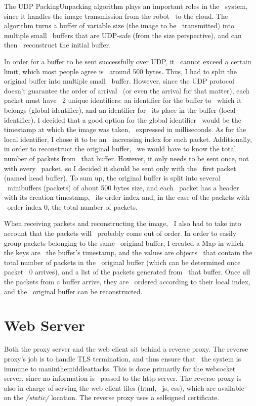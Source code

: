 The UDP Packing\-Unpacking algorithm plays an important roles in the \
system, since it handles the image transmission from the robot \
to the cloud.
The algorithm turns a buffer of variable size (the image to be \
transmitted) into multiple small \
buffers that are UDP-safe (from the size perspective), and can then \
reconstruct the initial buffer.

In order for a buffer to be sent successfully over UDP, it \
cannot exceed a certain limit, which most people agree is \
around 500 bytes.
Thus, I had to split the original buffer into multiple small \
buffer.
However, since the UDP protocol doesn't guarantee the order of arrival \
(or even the arrival for that matter), each packet must have \
2 unique identifiers: an identifier for the buffer to \
which it belongs (global identifier), and an identifier for \
its place in the buffer (local identifier).
I decided that a good option for the global identifier \
would be the timestamp at which the image was taken, \
expressed in milliseconds.
As for the local identifier, I chose it to be an \
increasing index for each packet.
Additionally, in order to reconstruct the original buffer, \
we would have to know the total number of packets from \
that buffer.
However, it only needs to be sent once, not with every \
packet, so I decided it should be sent only with the \
first packet (named head buffer).
To sum up, the original buffer is split into several \
mini\-buffers (packets) of about 500 bytes size, and each \
packet has a header with its creation timestamp, \
its order index and, in the case of the packets with \
order index 0, the total number of packets.

When receiving packets and reconstructing the image, \
I also had to take into account that the packets will \
probably come out of order.
In order to easily group packets belonging to the same \
original buffer, I created a Map in which the keys are \
the buffer's timestamp, and the values are objects \
that contain the total number of packets in the \
original buffer (which can be determined once packet \
0 arrives), and a list of the packets generated from \
that buffer.
Once all the packets from a buffer arrive, they are \
ordered according to their local index, and the \
original buffer can be reconstructed.



\section{Web Server}
\label{sec:web-server}
Both the proxy server and the web client sit behind a reverse proxy.
The reverse proxy's job is to handle TLS termination, and thus ensure that \
the system is immune to man\-in\-the\-middle\-attacks.
This is done primarily for the websocket server, since no information is \
passed to the http server.
The reverse proxy is also in charge of serving the web client files (html, \
js, css), which are available on the \textit{/static/} location.
The reverse proxy uses a self\-signed certificate.

